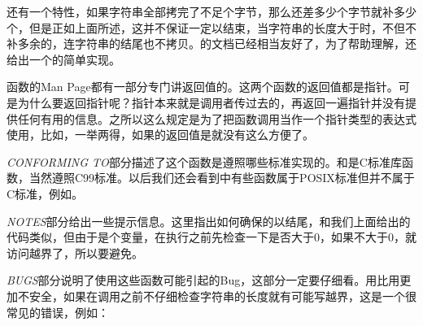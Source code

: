 

还有一个特性，如果字符串全部拷完了不足个字节，那么还差多少个字节就补多少个，但是正如上面所述，这并不保证一定以结束，当字符串的长度大于时，不但不补多余的，连字符串的结尾也不拷贝。的文档已经相当友好了，为了帮助理解，还给出一个的简单实现。




函数的Man Page都有一部分专门讲返回值的。这两个函数的返回值都是指针。可是为什么要返回指针呢？指针本来就是调用者传过去的，再返回一遍指针并没有提供任何有用的信息。之所以这么规定是为了把函数调用当作一个指针类型的表达式使用，比如，一举两得，如果的返回值是就没有这么方便了。



\emph{CONFORMING TO}部分描述了这个函数是遵照哪些标准实现的。和是C标准库函数，当然遵照C99标准。以后我们还会看到中有些函数属于POSIX标准但并不属于C标准，例如。



\emph{NOTES}部分给出一些提示信息。这里指出如何确保的以结尾，和我们上面给出的代码类似，但由于是个变量，在执行之前先检查一下是否大于0，如果不大于0，就访问越界了，所以要避免。




\emph{BUGS}部分说明了使用这些函数可能引起的Bug，这部分一定要仔细看。用比用更加不安全，如果在调用之前不仔细检查字符串的长度就有可能写越界，这是一个很常见的错误，例如：


